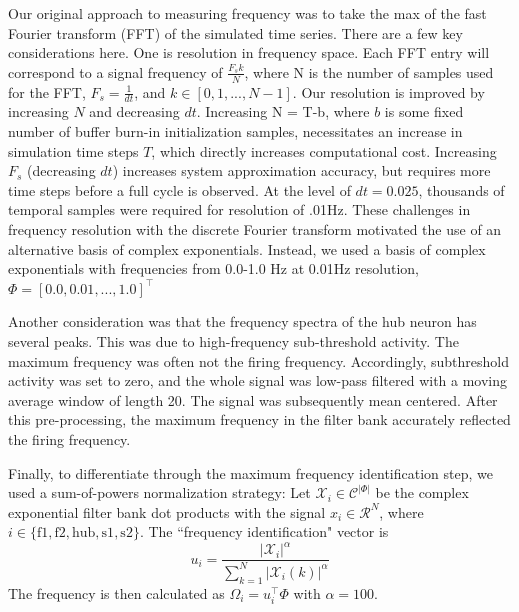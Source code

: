 \documentclass[11pt]{article}
\begin{document}
Our original approach to measuring frequency was to take the max of the fast Fourier transform (FFT) of the simulated time series.  There are a few key considerations here.  One is resolution in frequency space.  Each FFT entry will correspond to a signal frequency of $\frac{F_s k}{N}$, where N is the number of samples used for the FFT, $F_s = \frac{1}{dt}$, and $k \in \left[0, 1, ..., N-1\right]$.  Our resolution is improved by increasing $N$ and decreasing $dt$.  Increasing N = T-b, where $b$ is some fixed number of buffer burn-in initialization samples, necessitates an increase in simulation time steps $T$, which directly increases computational cost.  Increasing $F_s$ (decreasing $dt$) increases system approximation accuracy, but requires more time steps before a full cycle is observed.  At the level of $dt = 0.025$, thousands of temporal samples were required for resolution of .01Hz.  These challenges in frequency resolution with the discrete Fourier transform motivated the use of an alternative basis of complex exponentials.  Instead, we used a basis of complex exponentials with frequencies from 0.0-1.0 Hz at 0.01Hz resolution, $\Phi = \left[ 0.0, 0.01, ..., 1.0 \right]^\top$

Another consideration was that the frequency spectra of the hub neuron has several peaks.  This was due to high-frequency sub-threshold activity. The maximum frequency was often not the firing frequency.  Accordingly, subthreshold activity was set to zero, and the whole signal was low-pass filtered with a moving average window of length 20.  The signal was subsequently mean centered.  After this pre-processing, the maximum frequency in the filter bank accurately reflected the firing frequency.

Finally, to differentiate through the maximum frequency identification step, we used a sum-of-powers normalization strategy: Let $\mathcal{X}_i \in \mathcal{C}^{|\Phi|}$ be the complex exponential filter bank dot products with the signal $x_i \in \mathcal{R}^{N}$, where $i \in \{ \text{f1}, \text{f2}, \text{hub}, \text{s1}, \text{s2} \}$.  The ``frequency identification" vector is 
\begin{equation}
u_i = \frac{|\mathcal{X}_i|^\alpha}{\sum_{k=1}^N |\mathcal{X}_i(k)|^\alpha}
\end{equation}
The frequency is then calculated as $\Omega_i = u_i^\top \Phi$ with $\alpha = 100$.
\end{document}
